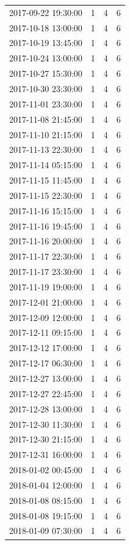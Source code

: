 \begin{tabular}{lrrr}
2017-09-22 19:30:00 & 1 & 4 & 6 \\
2017-10-18 13:00:00 & 1 & 4 & 6 \\
2017-10-19 13:45:00 & 1 & 4 & 6 \\
2017-10-24 13:00:00 & 1 & 4 & 6 \\
2017-10-27 15:30:00 & 1 & 4 & 6 \\
2017-10-30 23:30:00 & 1 & 4 & 6 \\
2017-11-01 23:30:00 & 1 & 4 & 6 \\
2017-11-08 21:45:00 & 1 & 4 & 6 \\
2017-11-10 21:15:00 & 1 & 4 & 6 \\
2017-11-13 22:30:00 & 1 & 4 & 6 \\
2017-11-14 05:15:00 & 1 & 4 & 6 \\
2017-11-15 11:45:00 & 1 & 4 & 6 \\
2017-11-15 22:30:00 & 1 & 4 & 6 \\
2017-11-16 15:15:00 & 1 & 4 & 6 \\
2017-11-16 19:45:00 & 1 & 4 & 6 \\
2017-11-16 20:00:00 & 1 & 4 & 6 \\
2017-11-17 22:30:00 & 1 & 4 & 6 \\
2017-11-17 23:30:00 & 1 & 4 & 6 \\
2017-11-19 19:00:00 & 1 & 4 & 6 \\
2017-12-01 21:00:00 & 1 & 4 & 6 \\
2017-12-09 12:00:00 & 1 & 4 & 6 \\
2017-12-11 09:15:00 & 1 & 4 & 6 \\
2017-12-12 17:00:00 & 1 & 4 & 6 \\
2017-12-17 06:30:00 & 1 & 4 & 6 \\
2017-12-27 13:00:00 & 1 & 4 & 6 \\
2017-12-27 22:45:00 & 1 & 4 & 6 \\
2017-12-28 13:00:00 & 1 & 4 & 6 \\
2017-12-30 11:30:00 & 1 & 4 & 6 \\
2017-12-30 21:15:00 & 1 & 4 & 6 \\
2017-12-31 16:00:00 & 1 & 4 & 6 \\
2018-01-02 00:45:00 & 1 & 4 & 6 \\
2018-01-04 12:00:00 & 1 & 4 & 6 \\
2018-01-08 08:15:00 & 1 & 4 & 6 \\
2018-01-08 19:15:00 & 1 & 4 & 6 \\
2018-01-09 07:30:00 & 1 & 4 & 6 \\

\end{tabular}
